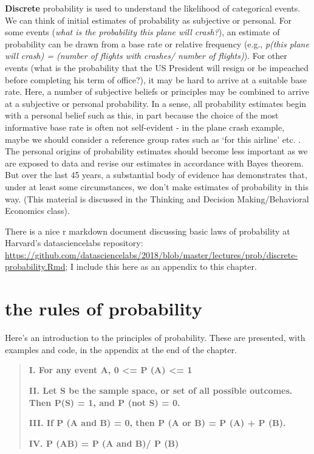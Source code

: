 \documentclass[
  openany]{book}
\begin{document}
\textbf{Discrete} probability is used to understand the likelihood of categorical events. We can think of initial estimates of probability as subjective or personal. For some events (\emph{what is the probability this plane will crash?}), an estimate of probability can be drawn from a base rate or relative frequency (e.g., \emph{p(this plane will crash) = (number of flights with crashes/ number of flights)}). For other events (what is the probability that the US President will resign or be impeached before completing his term of office?), it may be hard to arrive at a suitable base rate. Here, a number of subjective beliefs or principles may be combined to arrive at a subjective or personal probability. In a sense, all probability estimates begin with a personal belief such as this, in part because the choice of the most informative base rate is often not self-evident - in the plane crash example, maybe we should consider a reference group rates such as `for this airline' etc. \citep{lanning1987some}. The personal origins of probability estimates should become less important as we are exposed to data and revise our estimates in accordance with Bayes theorem. But over the last 45 years, a substantial body of evidence has demonstrates that, under at least some circumstances, we don't make estimates of probability in this way. (This material is discussed in the Thinking and Decision Making/Behavioral Economics class).

There is a nice r markdown document discussing basic laws of probability at Harvard's datasciencelabs repository: \url{https://github.com/datasciencelabs/2018/blob/master/lectures/prob/discrete-probability.Rmd}; I include this here as an appendix to this chapter.

\hypertarget{the-rules-of-probability}{%
\section{the rules of probability}\label{the-rules-of-probability}}

Here's an introduction to the principles of probability. These are presented, with examples and code, in the appendix at the end of the chapter.

\begin{quote}
\textbf{I. For any event A, 0 \textless= P (A) \textless= 1}

\textbf{II. Let S be the sample space, or set of all possible outcomes. Then P(S) = 1, and P (not S) = 0.}

\textbf{III. If P (A and B) = 0, then P (A or B) = P (A) + P (B).}

\textbf{IV. P (A\textbar B) = P (A and B)/ P (B)}
\end{quote}
\end{document}

